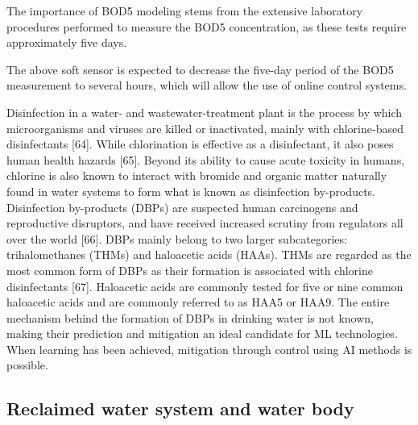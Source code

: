

The importance of BOD5 modeling stems from the extensive laboratory procedures performed to measure the BOD5 concentration, as these tests require approximately five days. 

The above soft sensor is expected to decrease the five-day period of the BOD5 measurement to several hours, which will allow the use of online control systems. \citep{alsulailiArtificialNeuralNetwork2021}


Disinfection in a water- and wastewater-treatment plant is the process by which microorganisms and viruses are killed or inactivated, mainly with chlorine-based disinfectants [64]. While chlorination is effective as a disinfectant, it also poses human health hazards [65]. Beyond its ability to cause acute toxicity in humans, chlorine is also known to interact with bromide and organic matter naturally found in water systems to form what is known as disinfection by-products. Disinfection by-products (DBPs) are suspected human carcinogens and reproductive disruptors, and have received increased scrutiny from regulators all over the world [66]. DBPs mainly belong to two larger subcategories: trihalomethanes (THMs) and haloacetic acids (HAAs). THMs are regarded as the most common form of DBPs as their formation is associated with chlorine disinfectants [67]. Haloacetic acids are commonly tested for five or nine common haloacetic acids and are commonly referred to as HAA5 or HAA9. The entire mechanism behind the formation of DBPs in drinking water is not known, making their prediction and mitigation an ideal candidate for ML technologies. When learning has been achieved, mitigation through control using AI methods is possible.




\subsection{Reclaimed water system and water body}

